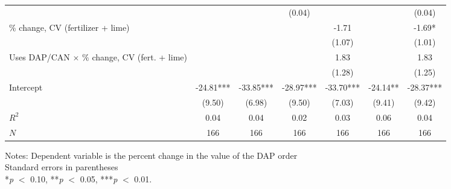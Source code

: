 \begin{table}[htbp]
\begin{threeparttable}
\begin{tabular}{l cccccc}
                    &               &               &      (0.04)   &               &               &      (0.04)   \\
$\%$ change, CV (fertilizer + lime)&               &               &               &       -1.71   &               &       -1.69*  \\
                    &               &               &               &      (1.07)   &               &      (1.01)   \\
Uses DAP/CAN $\times$ $\%$ change, CV (fert. + lime)&               &               &               &        1.83   &               &        1.83   \\
                    &               &               &               &      (1.28)   &               &      (1.25)   \\
Intercept           &      -24.81***&      -33.85***&      -28.97***&      -33.70***&      -24.14** &      -28.37***\\
                    &      (9.50)   &      (6.98)   &      (9.50)   &      (7.03)   &      (9.41)   &      (9.42)   \\
\hline
$R^2$               &        0.04   &        0.04   &        0.02   &        0.03   &        0.06   &        0.04   \\
$N$                 &         166   &         166   &         166   &         166   &         166   &         166   \\
\hline
\hline
\end{tabular}
\begin{tablenotes}
\footnotesize
\item{Notes:  Dependent variable is the percent change in the value of the DAP order \\ Standard errors in parentheses \\ *\textit{p} $<$ 0.10, **\textit{p} $<$ 0.05, ***\textit{p} $<$ 0.01.}
\end{tablenotes}
\end{threeparttable}
\end{table}
